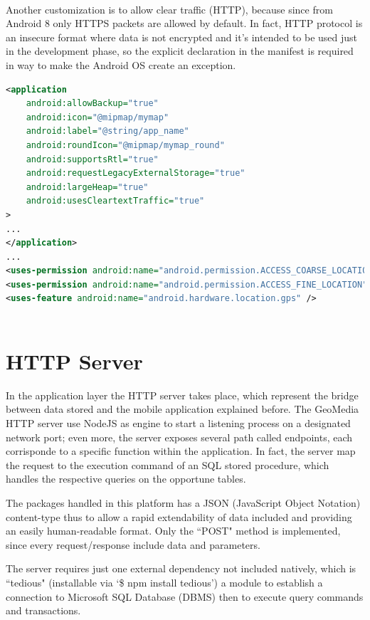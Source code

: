 \documentclass[conference]{IEEEtran}
\begin{document}
\\
Another customization is to allow clear traffic (HTTP), because since from Android 8 only HTTPS packets are allowed by default.
In fact, HTTP protocol is an insecure format where data is not encrypted and it's intended to be used just in the development phase, so the explicit declaration in the manifest is required in way to make the Android OS create an exception.

\begin{lstlisting}[language=XML, caption=Snippet of Android Manifest]
<application
    android:allowBackup="true"
    android:icon="@mipmap/mymap"
    android:label="@string/app_name"
    android:roundIcon="@mipmap/mymap_round"
    android:supportsRtl="true"
    android:requestLegacyExternalStorage="true"
    android:largeHeap="true"
    android:usesCleartextTraffic="true"
>
...
</application>
...
<uses-permission android:name="android.permission.ACCESS_COARSE_LOCATION" />
<uses-permission android:name="android.permission.ACCESS_FINE_LOCATION" />
<uses-feature android:name="android.hardware.location.gps" />
        
\end{lstlisting}

\section{HTTP Server}

In the application layer the HTTP server takes place, which represent the bridge between data stored and the mobile application explained before.
The GeoMedia HTTP server use NodeJS\cite{b4} as engine to start a listening process on a designated network port; even more, the server exposes several path called endpoints, each corrisponde to a specific function within the application. In fact, the server map the request to the execution command of an SQL stored procedure, which handles the respective queries on the opportune tables.

The packages handled in this platform has a JSON (JavaScript Object Notation) content-type thus to allow a rapid extendability of data included and providing an easily human-readable format.
Only the ``POST" method is implemented, since every request/response include data and parameters.

The server requires just one external dependency not included natively, which is ``tedious"\cite{b5} (installable via `\$ npm install tedious') a module to establish a connection to Microsoft SQL Database (DBMS) then to execute query commands and transactions.
\end{document}
